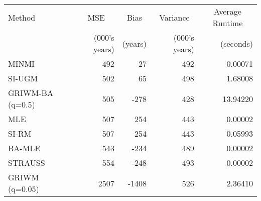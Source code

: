 
\begin{tabular}{lrrrr}
\toprule
\multicolumn{1}{l}{Method} & \multicolumn{1}{c}{MSE} & \multicolumn{1}{c}{Bias} & \multicolumn{1}{c}{Variance} & \multicolumn{1}{c}{Average Runtime} \\
 & (000's years) & (years) & (000's years) & (seconds)\\
\midrule
MINMI & 492 & 27 & 492 & 0.00071\\
SI-UGM & 502 & 65 & 498 & 1.68008\\
GRIWM-BA (q=0.5) & 505 & -278 & 428 & 13.94220\\
MLE & 507 & 254 & 443 & 0.00002\\
SI-RM & 507 & 254 & 443 & 0.05993\\
\addlinespace
BA-MLE & 543 & -234 & 489 & 0.00002\\
STRAUSS & 554 & -248 & 493 & 0.00002\\
GRIWM (q=0.05) & 2507 & -1408 & 526 & 2.36410\\
\bottomrule
\end{tabular}
